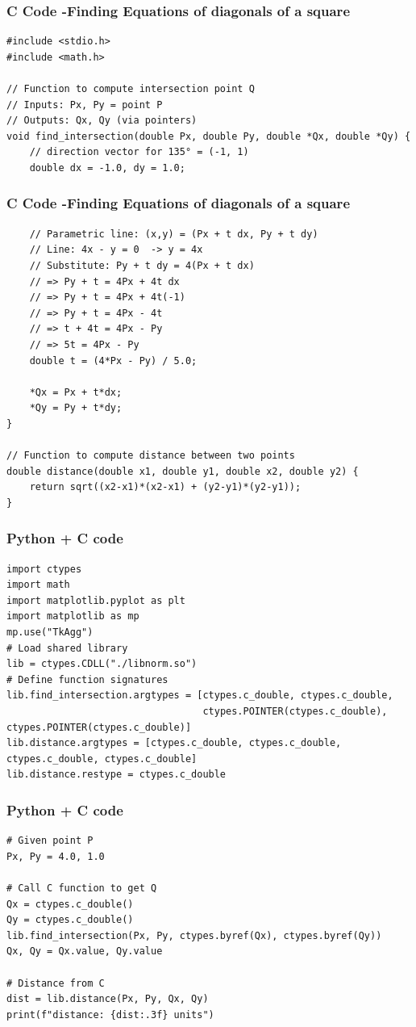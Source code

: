 \documentclass{beamer}
\begin{document}
\begin{frame}[fragile]
    \frametitle{C Code -Finding Equations of diagonals of a square}

    \begin{lstlisting}
#include <stdio.h>
#include <math.h>

// Function to compute intersection point Q
// Inputs: Px, Py = point P
// Outputs: Qx, Qy (via pointers)
void find_intersection(double Px, double Py, double *Qx, double *Qy) {
    // direction vector for 135° = (-1, 1)
    double dx = -1.0, dy = 1.0;

    \end{lstlisting}
\end{frame}

\begin{frame}[fragile]
    \frametitle{C Code -Finding Equations of diagonals of a square}

    \begin{lstlisting}
    // Parametric line: (x,y) = (Px + t dx, Py + t dy)
    // Line: 4x - y = 0  -> y = 4x
    // Substitute: Py + t dy = 4(Px + t dx)
    // => Py + t = 4Px + 4t dx
    // => Py + t = 4Px + 4t(-1)
    // => Py + t = 4Px - 4t
    // => t + 4t = 4Px - Py
    // => 5t = 4Px - Py
    double t = (4*Px - Py) / 5.0;

    *Qx = Px + t*dx;
    *Qy = Py + t*dy;
}

// Function to compute distance between two points
double distance(double x1, double y1, double x2, double y2) {
    return sqrt((x2-x1)*(x2-x1) + (y2-y1)*(y2-y1));
}
    \end{lstlisting}
\end{frame}

\begin{frame}[fragile]
    \frametitle{Python + C code}

    \begin{lstlisting}
import ctypes
import math
import matplotlib.pyplot as plt
import matplotlib as mp
mp.use("TkAgg")
# Load shared library
lib = ctypes.CDLL("./libnorm.so")
# Define function signatures
lib.find_intersection.argtypes = [ctypes.c_double, ctypes.c_double,
                                  ctypes.POINTER(ctypes.c_double), ctypes.POINTER(ctypes.c_double)]
lib.distance.argtypes = [ctypes.c_double, ctypes.c_double, ctypes.c_double, ctypes.c_double]
lib.distance.restype = ctypes.c_double
    \end{lstlisting}
\end{frame}

\begin{frame}[fragile]
    \frametitle{Python + C code}

    \begin{lstlisting}
# Given point P
Px, Py = 4.0, 1.0

# Call C function to get Q
Qx = ctypes.c_double()
Qy = ctypes.c_double()
lib.find_intersection(Px, Py, ctypes.byref(Qx), ctypes.byref(Qy))
Qx, Qy = Qx.value, Qy.value

# Distance from C
dist = lib.distance(Px, Py, Qx, Qy)
print(f"distance: {dist:.3f} units")

    \end{lstlisting}
\end{frame}
\end{document}

